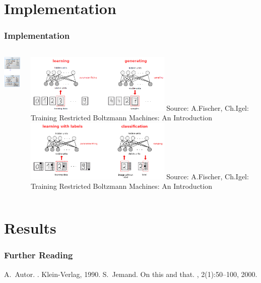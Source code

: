 \documentclass{beamer}
\begin{document}
  \section{Implementation}
  \begin{frame}[plain]
  \frametitle{Implementation}
  \begin{columns}
        \begin{column}{0.3\textwidth}
            \includegraphics[width=3cm]{images/classDiagram.png}
        \end{column}
        \begin{column}{0.7\textwidth}
			\centering
			\includegraphics[width = 7cm]{images/generativeRBM.png}
			{\TINY Source: A.Fischer, Ch.Igel: Training Restricted Boltzmann Machines: An Introduction}
			\includegraphics[width = 7cm]{images/DRBM.png}
			{\TINY Source: A.Fischer, Ch.Igel: Training Restricted Boltzmann Machines: An Introduction}
        \end{column}
    \end{columns}
  \end{frame}
  \section{Results}
  \begin{frame}[allowframebreaks]
  \frametitle<presentation>{Further Reading}    
  \begin{thebibliography}{10}    
  \beamertemplatebookbibitems
    A.~Autor.
    .
    \newblock Klein-Verlag, 1990.
  \beamertemplatearticlebibitems
    S.~Jemand.
    \newblock On this and that.
    , 2(1):50--100, 2000.
  \end{thebibliography}
  \end{frame}
\end{document}
